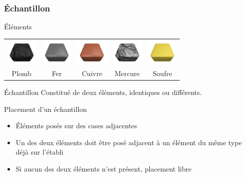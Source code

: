 \documentclass{beamer}
\begin{document}
\begin{frame}
    \frametitle{Échantillon}
    \begin{block}{Éléments}
        \begin{tabular}{ccccc}
            \includegraphics[width=1.5cm]{../img/material-lead} &
            \includegraphics[width=1.5cm]{../img/material-iron} &
            \includegraphics[width=1.5cm]{../img/material-copper} &
            \includegraphics[width=1.5cm]{../img/material-mercury} &
            \includegraphics[width=1.5cm]{../img/material-sulfur}\\
            Plomb & Fer & Cuivre & Mercure & Soufre
        \end{tabular}
    \end{block}
    \begin{block}{Échantillon}
        Constitué de deux éléments, identiques ou différents.
    \end{block}
    \begin{block}{Placement d'un échantillon}
        \begin{itemize}
            \item Éléments posés sur des cases adjacentes
            \item Un des deux éléments doit être posé adjacent à un élément du
                même type déjà sur l'établi
            \item Si aucun des deux éléments n'est présent, placement libre
        \end{itemize}
    \end{block}
\end{frame}
\end{document}
